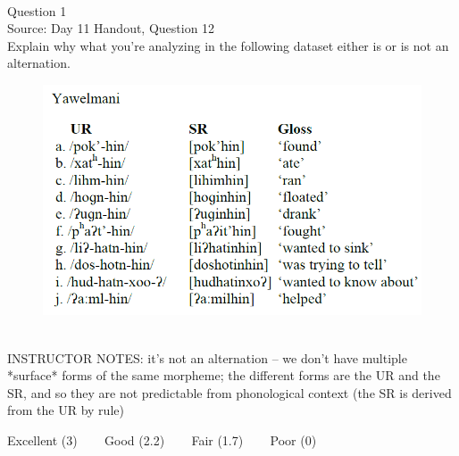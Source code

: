 \documentclass[12pt]{article}
\begin{document}
\begin{center}
\textbf{{\color{red}{\HUGE END OF EXAM}}}\\

\end{center}
\newpage

\begin{center}
\textbf{{\color{blue}{\HUGE START OF EXAM\\}}}

\textbf{{\color{blue}{\HUGE Student ID: 6948\\}}}

\textbf{{\color{blue}{\HUGE 2:20 - 2:40 PM\\}}}

\end{center}
\newpage

{\large Question 1}\\

Source: Day 11 Handout, Question 12\\

Explain why what you’re analyzing in the following dataset either is or is not an alternation.\\

\begin{figure}[H]
\includegraphics{../images/yawelmani.png}
\end{figure}

~\\
INSTRUCTOR NOTES: it's not an alternation -- we don't have multiple *surface* forms of the same morpheme; the different forms are the UR and the SR, and so they are not predictable from phonological context (the SR is derived from the UR by rule)


\vfill
Excellent (3) ~~~ Good (2.2) ~~~ Fair (1.7) ~~~ Poor (0)
\newpage
\end{document}
